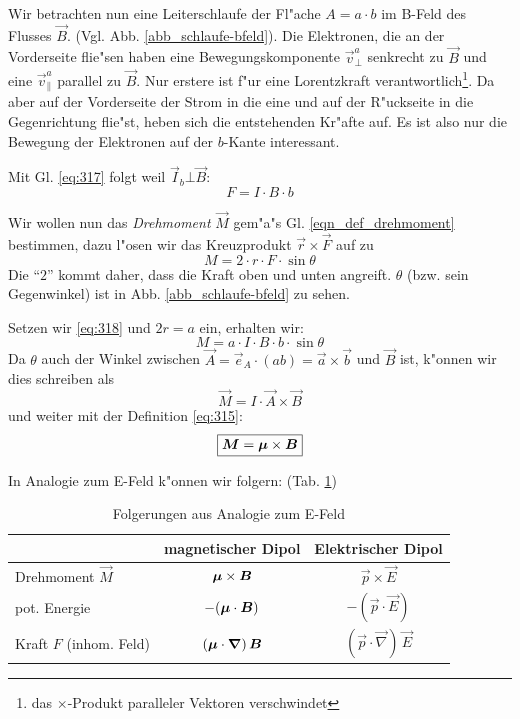 Wir betrachten nun eine Leiterschlaufe der Fl"ache $A = a \cdot b$ im
B-Feld des Flusses $\vec B$.
(Vgl. Abb. \ref{abb_schlaufe-bfeld}). Die Elektronen, die an der
Vorderseite flie"sen haben eine Bewegungskomponente $\vec v^a_\bot$
senkrecht zu $\vec B$ und eine $\vec v^a_\|$ parallel zu $\vec B$. Nur
erstere ist f"ur eine Lorentzkraft verantwortlich\footnote{das
  $\times$-Produkt paralleler Vektoren verschwindet}. Da aber auf der
Vorderseite der Strom in die eine und auf der R"uckseite in die
Gegenrichtung flie"st, heben sich die entstehenden Kr"afte auf. Es ist
also nur die Bewegung der Elektronen auf der $b$-Kante interessant.

Mit Gl. \eqref{eq:317} folgt weil $\vec I_b \bot \vec B$:
\begin{equation}
   \label{eq:318}
   F = I \cdot B \cdot b
\end{equation}

Wir wollen nun das \emph{Drehmoment} $\vec M$ gem"a"s
Gl. \eqref{eqn_def_drehmoment} bestimmen, dazu l"osen wir das
Kreuzprodukt $\vec r\times \vec F$ auf zu
\begin{equation}
   \label{eq:321}
   M = 2 \cdot r \cdot F \cdot \sin \theta
\end{equation}
Die "`$2$"' kommt daher, dass die Kraft oben und unten
angreift. $\theta$ (bzw. sein Gegenwinkel) ist in
Abb. \ref{abb_schlaufe-bfeld} zu sehen.

Setzen wir \eqref{eq:318} und $2r = a$ ein, erhalten wir:
\begin{equation}
   \label{eq:322}
   M = a \cdot I \cdot B \cdot b \cdot \sin \theta
\end{equation}
Da $\theta$ auch der Winkel zwischen $\vec A = \vec e_A \cdot (ab) =
\vec a \times \vec b$ und $\vec B$ ist, k"onnen
wir dies schreiben als
\begin{equation}
   \label{eq:323}
   \vec M = I \cdot \vec A \times \vec B
\end{equation}
und weiter mit der Definition \eqref{eq:315}:
\begin{equation}
   \label{eq:324}
   \boxed{ \boldsymbol{M} = \boldsymbol{\mu} \times \boldsymbol{B} }
\end{equation}

\bigskip

In Analogie zum E-Feld k"onnen wir folgern:
(Tab. \ref{tab_eigenschaften_dipol_bfeld})
\begin{table}[h]
   \centering
   \begin{tabular}{l c c }
\toprule
      ~&  \textbf{magnetischer Dipol} & \textbf{Elektrischer Dipol}\\
\midrule
Drehmoment $\vec M$ & $\boldsymbol{\mu} \times \boldsymbol{B}$ & $\vec p \times \vec
E$\\
pot. Energie & $- (\boldsymbol{\mu} \cdot \boldsymbol{B})$ & $-(\vec p \cdot \vec E)$\\
Kraft $F$ (inhom. Feld) & $(\boldsymbol{\mu} \cdot \boldsymbol{\nabla})  \,  \boldsymbol{B}$ &
$(\vec p \cdot \vec \nabla) \, \vec E$\\
\bottomrule
   \end{tabular}
   \caption{Folgerungen aus Analogie zum E-Feld}
   \label{tab_eigenschaften_dipol_bfeld}
\end{table}



